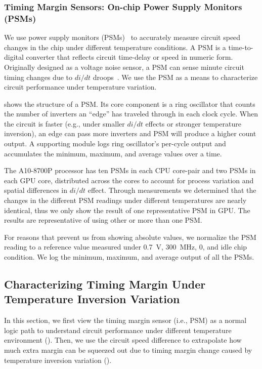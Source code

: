 \subsubsection{Timing Margin Sensors: On-chip Power Supply Monitors (PSMs)}
\label{sec:temperature:setup:psm}

We use power supply monitors (PSMs)~\cite{grenat20145,gillespie2014streamroller} to accurately measure circuit speed changes in the chip under different temperature conditions. A PSM is a time-to-digital converter that reflects circuit time-delay or speed in numeric form. Originally designed as a voltage noise sensor, a PSM can sense minute circuit timing changes due to $di/dt$ droops~\cite{grenat20145}. We use the PSM as a means to characterize circuit performance under temperature variation.

 shows the structure of a PSM. Its core component is a ring oscillator that counts the number of inverters an ``edge'' has traveled through in each clock cycle. When the circuit is faster (e.g., under smaller $di/dt$ effects or stronger temperature inversion), an edge can pass more inverters and PSM will produce a higher count output. A supporting module logs ring oscillator's per-cycle output and accumulates the minimum, maximum, and average values over a time.

The A10-8700P processor has ten PSMs in each CPU core-pair and two PSMs in each GPU core, distributed across the cores to account for process variation and spatial differences in $di/dt$ effect. Through measurements we determined that the changes in the different PSM readings under different temperatures are nearly identical, thus we only show the result of one representative PSM in GPU. The results are representative of using other or more than one PSM. 

For reasons that prevent us from showing absolute values, we normalize the PSM reading to a reference value measured under 0.7~V, 300~MHz, 0\C, and idle chip condition. We log the minimum, maximum, and average output of all the PSMs. 

\subsection{Characterizing Timing Margin Under Temperature Inversion Variation}
\label{sec:temperature:characterize}

In this section, we first view the timing margin sensor (i.e., PSM) as a normal logic path to understand circuit performance under different temperature environment (). Then, we use the circuit speed difference to extrapolate how much extra margin can be squeezed out due to timing margin change caused by temperature inversion variation ().


